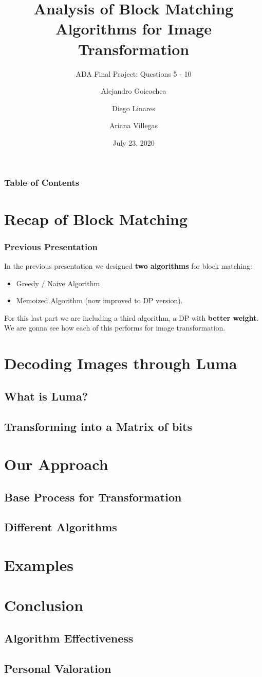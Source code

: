 \documentclass{beamer}
\title{Analysis of Block Matching Algorithms for Image Transformation}
\subtitle{ADA Final Project: Questions 5 - 10}
\author{Alejandro Goicochea\and Diego Linares\and Ariana Villegas}
\institute{\inst{}Universidad de Ingeniería y Tecnología}
\date{July 23, 2020}
\begin{document}
  \frame{\titlepage}
  \begin{frame}
    \frametitle{Table of Contents}
    \tableofcontents
  \end{frame}
  \section{Recap of Block Matching}
    \begin{frame}
      \frametitle{Previous Presentation}
      In the previous presentation we designed \textbf{two algorithms} for block matching:
      \begin{itemize}
        \item Greedy / Naive Algorithm
        \item Memoized Algorithm (now improved to DP version).
      \end{itemize}
      \medskip
      For this last part we are including a third algorithm, a DP with \textbf{better weight}.\\
      \medskip
      We are gonna see how each of this performs for image transformation. 
    \end{frame}
  \section{Decoding Images through Luma}
    \subsection{What is Luma?}
    \subsection{Transforming into a Matrix of bits}
  \section{Our Approach}
    \subsection{Base Process for Transformation}
    \subsection{Different Algorithms}
  \section{Examples}
  \section{Conclusion}
    \subsection{Algorithm Effectiveness}
    \subsection{Personal Valoration}
\end{document}
